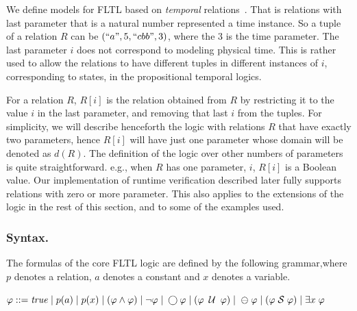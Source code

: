 We define models for FLTL based on {\em temporal} relations~\cite{Chomicki}. That is relations with
last parameter
that is a natural number represented a time instance. So a tuple of
a relation $R$ can be $(``a", 5, ``cbb", 3)$, where
the $3$ is the time parameter. The last parameter $i$
does not correspond to modeling physical time. This
is rather used to allow the relations to have
different tuples in different instances of $i$,
corresponding to states, in the propositional temporal
logics.

For a relation $R$, $R [ i ]$ is the relation obtained from $R$ by
restricting it to the value $i$ in the last parameter, and removing that last $i$ from the tuples. For simplicity, we will describe henceforth
the logic with relations $R$ that have exactly two parameters, 
hence $R [ i ]$ will have just one parameter whose domain will be denoted as $d ( R )$. The definition of the logic over other numbers of parameters is quite straightforward. e.g., when $R$ has one parameter, $i$,
$R [ i ]$ is a Boolean value. Our implementation of runtime verification described later fully supports relations with zero or more parameter. This also applies to the extensions of the logic in the rest of this section, and to some of the examples used.



\subsubsection{Syntax.} 

The formulas of the core FLTL logic are 
defined by the following grammar,where $p$ denotes a relation,
$a$ denotes a constant and $x$ denotes a variable. 
\begin{center}
$\varphi ::= \mathit{true}  \; | \;
    p ( a ) \; | \;
    p ( x ) \; | \;
    ( \varphi \wedge \varphi ) \;  |   \;
   \neg \varphi \; | \;
   \bigcirc \varphi \; | \; 
   ( \varphi \; \mathbin{\mathcal{U}} \; \varphi ) \; | $ %
   $ \ominus \; \varphi \; | \;
    ( \varphi  \; {\cal S}  \; \varphi ) \; | \;
    \exists x \; \varphi$
\end{center}


